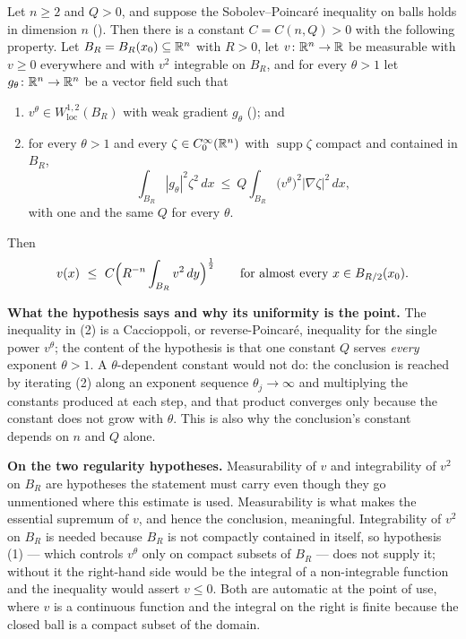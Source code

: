 \begin{lemma}
Let $n\ge2$ and $Q>0$, and suppose the Sobolev--Poincar\'e inequality on balls
holds in dimension $n$ ().  Then there is a
constant $C=C(n,Q)>0$ with the following property.  Let $B_R=B_R(x_0)\subseteq\mathbb{R}^n$
with $R>0$, let $v\colon\mathbb{R}^n\to\mathbb{R}$ be measurable with $v\ge0$ everywhere and
with $v^2$ integrable on $B_R$, and for every $\theta>1$ let
$g_\theta\colon\mathbb{R}^n\to\mathbb{R}^n$ be a vector field such that
\begin{enumerate}
\item $v^\theta\in W^{1,2}_{\mathrm{loc}}(B_R)$ with weak gradient $g_\theta$
  (); and
\item for every $\theta>1$ and every $\zeta\in C_0^\infty(\mathbb{R}^n)$ with
  $\operatorname{supp}\zeta$ compact and contained in $B_R$,
  \[
  \int_{B_R}|g_\theta|^2\zeta^2\,dx
  \ \le\ Q\int_{B_R}\bigl(v^\theta\bigr)^2|\nabla\zeta|^2\,dx ,
  \]
  with one and the same $Q$ for every $\theta$.
\end{enumerate}
Then
\[
v(x)\ \le\ C\Bigl(R^{-n}\int_{B_R}v^2\,dy\Bigr)^{\frac12}
\qquad\text{for almost every }x\in B_{R/2}(x_0).
\]

\textbf{What the hypothesis says and why its uniformity is the point.}  The
inequality in (2) is a Caccioppoli, or reverse-Poincar\'e, inequality for the
single power $v^\theta$; the content of the hypothesis is that one constant $Q$
serves \emph{every} exponent $\theta>1$.  A $\theta$-dependent constant would
not do: the conclusion is reached by iterating (2) along an exponent sequence
$\theta_j\to\infty$ and multiplying the constants produced at each step, and
that product converges only because the constant does not grow with $\theta$.
This is also why the conclusion's constant depends on $n$ and $Q$ alone.

\textbf{On the two regularity hypotheses.}  Measurability of $v$ and
integrability of $v^2$ on $B_R$ are hypotheses the statement must carry even
though they go unmentioned where this estimate is used.  Measurability is what
makes the essential supremum of $v$, and hence the conclusion, meaningful.
Integrability of $v^2$ on $B_R$ is needed because $B_R$ is not compactly
contained in itself, so hypothesis (1) --- which controls $v^\theta$ only on
compact subsets of $B_R$ --- does not supply it; without it the right-hand side
would be the integral of a non-integrable function and the inequality would
assert $v\le0$.  Both are automatic at the point of use, where $v$ is a
continuous function and the integral on the right is finite because the closed
ball is a compact subset of the domain.


\end{lemma}
